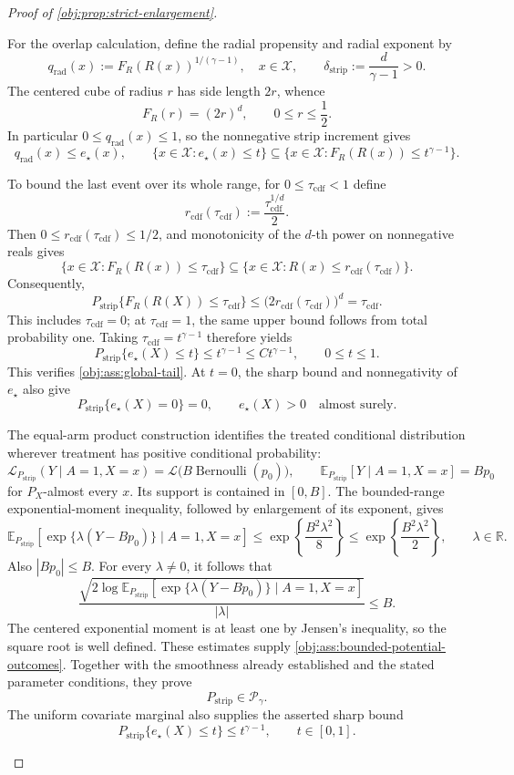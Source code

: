 \documentclass[11pt]{article}
\begin{document}
\begin{proof}[Proof of \cref{obj:prop:strict-enlargement}]
\begin{enumerate}
For the overlap calculation, define the radial propensity and radial exponent by
\[
q_{\mathrm{rad}}(x)
:=F_R(R(x))^{1/(\gamma-1)},\quad x\in\mathcal X,
\qquad
\delta_{\mathrm{strip}}:=\frac d{\gamma-1}>0.
\]
The centered cube of radius \(r\) has side length \(2r\), whence
\[
F_R(r)=(2r)^d,\qquad 0\le r\le\frac12.
\]
In particular \(0\le q_{\mathrm{rad}}(x)\le1\), so the nonnegative strip increment gives
\[
q_{\mathrm{rad}}(x)\le e_\star(x),
\qquad
\{x\in\mathcal X:e_\star(x)\le t\}
\subseteq
\{x\in\mathcal X:F_R(R(x))\le t^{\gamma-1}\}.
\]

To bound the last event over its whole range, for \(0\le\tau_{\mathrm{cdf}}<1\) define
\[
r_{\mathrm{cdf}}(\tau_{\mathrm{cdf}})
:=\frac{\tau_{\mathrm{cdf}}^{1/d}}2.
\]
Then \(0\le r_{\mathrm{cdf}}(\tau_{\mathrm{cdf}})\le1/2\), and monotonicity of the \(d\)-th power on nonnegative reals gives
\[
\{x\in\mathcal X:F_R(R(x))\le\tau_{\mathrm{cdf}}\}
\subseteq
\{x\in\mathcal X:R(x)\le r_{\mathrm{cdf}}(\tau_{\mathrm{cdf}})\}.
\]
Consequently,
\[
P_{\mathrm{strip}}\{F_R(R(X))\le\tau_{\mathrm{cdf}}\}
\le
\bigl(2r_{\mathrm{cdf}}(\tau_{\mathrm{cdf}})\bigr)^d
=\tau_{\mathrm{cdf}}.
\]
This includes \(\tau_{\mathrm{cdf}}=0\); at \(\tau_{\mathrm{cdf}}=1\), the same upper bound follows from total probability one. Taking \(\tau_{\mathrm{cdf}}=t^{\gamma-1}\) therefore yields
\[
P_{\mathrm{strip}}\{e_\star(X)\le t\}
\le t^{\gamma-1}
\le Ct^{\gamma-1},
\qquad 0\le t\le1.
\]
This verifies \cref{obj:ass:global-tail}. At \(t=0\), the sharp bound and nonnegativity of \(e_\star\) also give
\[
P_{\mathrm{strip}}\{e_\star(X)=0\}=0,
\qquad
e_\star(X)>0\quad\text{almost surely}.
\]

The equal-arm product construction identifies the treated conditional distribution wherever treatment has positive conditional probability:
\[
\mathcal L_{P_{\mathrm{strip}}}(Y\mid A=1,X=x)
=\mathcal L\bigl(B\operatorname{Bernoulli}(p_0)\bigr),
\qquad
\mathbb E_{P_{\mathrm{strip}}}[Y\mid A=1,X=x]=Bp_0
\]
for \(P_X\)-almost every \(x\). Its support is contained in \([0,B]\). The bounded-range exponential-moment inequality, followed by enlargement of its exponent, gives
\[
\mathbb E_{P_{\mathrm{strip}}}
\!\left[\exp\{\lambda(Y-Bp_0)\}\mid A=1,X=x\right]
\le
\exp\left\{\frac{B^2\lambda^2}{8}\right\}
\le
\exp\left\{\frac{B^2\lambda^2}{2}\right\},
\qquad \lambda\in\mathbb R.
\]
Also \(|Bp_0|\le B\). For every \(\lambda\ne0\), it follows that
\[
\frac{
\sqrt{2\log\mathbb E_{P_{\mathrm{strip}}}
[\exp\{\lambda(Y-Bp_0)\}\mid A=1,X=x]}
}{|\lambda|}
\le B.
\]
The centered exponential moment is at least one by Jensen's inequality, so the square root is well defined. These estimates supply \cref{obj:ass:bounded-potential-outcomes}. Together with the smoothness already established and the stated parameter conditions, they prove
\[
P_{\mathrm{strip}}\in\mathcal P_\gamma.
\]
The uniform covariate marginal also supplies the asserted sharp bound
\[
P_{\mathrm{strip}}\{e_\star(X)\le t\}\le t^{\gamma-1},
\qquad t\in[0,1].
\]


\end{enumerate}
\end{proof}
\end{document}
